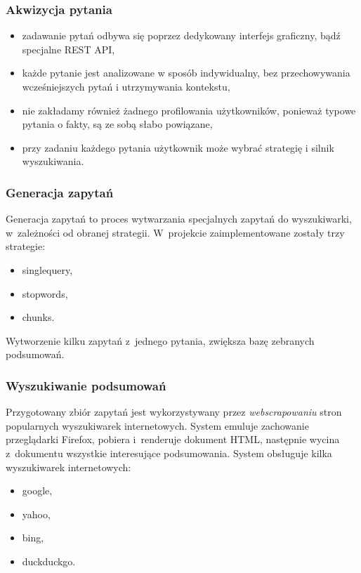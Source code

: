\documentclass{beamer}
\begin{document}
\begin{frame}
  \frametitle{Akwizycja pytania}
    \begin{itemize}
      \item zadawanie pytań odbywa się poprzez dedykowany interfejs graficzny, bądź specjalne REST API,
      \item każde pytanie jest analizowane w sposób indywidualny, bez przechowywania wcześniejszych pytań i utrzymywania kontekstu,
      \item nie zakładamy również żadnego profilowania użytkowników, ponieważ typowe pytania o fakty, są ze sobą słabo powiązane,
      \item przy zadaniu każdego pytania użytkownik może wybrać strategię i silnik wyszukiwania.
    \end{itemize}
\end{frame}

\begin{frame}
  \frametitle{Generacja zapytań}
  Generacja zapytań to proces wytwarzania specjalnych zapytań do wyszukiwarki, w~zależności od obranej strategii. W~projekcie zaimplementowane zostały trzy strategie:
  \begin{itemize}
    \item singlequery,
    \item stopwords,
    \item chunks.
  \end{itemize}
  Wytworzenie kilku zapytań z~jednego pytania, zwiększa bazę zebranych podsumowań.
\end{frame}

\begin{frame}
  \frametitle{Wyszukiwanie podsumowań}
  Przygotowany zbiór zapytań jest wykorzystywany przez \textit{webscrapowaniu} stron popularnych wyszukiwarek internetowych. System emuluje zachowanie przeglądarki Firefox, pobiera i~renderuje dokument HTML, następnie wycina z~dokumentu wszystkie interesujące podsumowania.
  System obsługuje kilka wyszukiwarek internetowych:
  \begin{itemize}
    \item google,
    \item yahoo,
    \item bing,
    \item duckduckgo.
  \end{itemize}
\end{frame}
\end{document}

